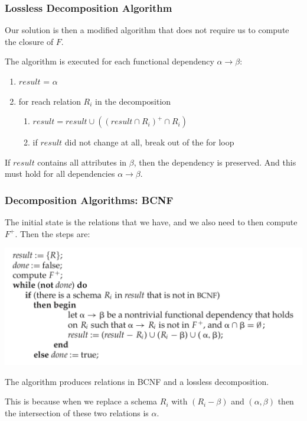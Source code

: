 \begin{frame}
\frametitle{Lossless Decomposition Algorithm}

Our solution is then a modified algorithm that does not require us to compute the closure of $F$. 

The algorithm is executed for each functional dependency $\alpha \rightarrow \beta$:


\begin{enumerate}
	\item $result$ = $\alpha$
	\item for reach relation $R_{i}$ in the decomposition
	\begin{enumerate}
		\item $result = result \cup (  (result \cap R_{i})^{+} \cap R_{i} )$
	    \item if $result$ did not change at all, break out of the for loop
	    \end{enumerate}
\end{enumerate}

If $result$ contains all attributes in $\beta$, then the dependency is preserved. And this must hold for all dependencies $\alpha \rightarrow \beta$.

\end{frame}



\begin{frame}
\frametitle{Decomposition Algorithms: BCNF}
The initial state is the relations that we have, and we also need to then compute $F^{+}$. Then the steps are:

\begin{center}
\includegraphics[width=0.7 \textwidth]{images/bcnf-algorithm}
\end{center}

The algorithm produces relations in BCNF and a lossless decomposition. 

This is because when we replace a schema $R_{i}$ with $(R_{i} - \beta)$ and $(\alpha, \beta)$ then the intersection of these two relations is $\alpha$.

\end{frame}



